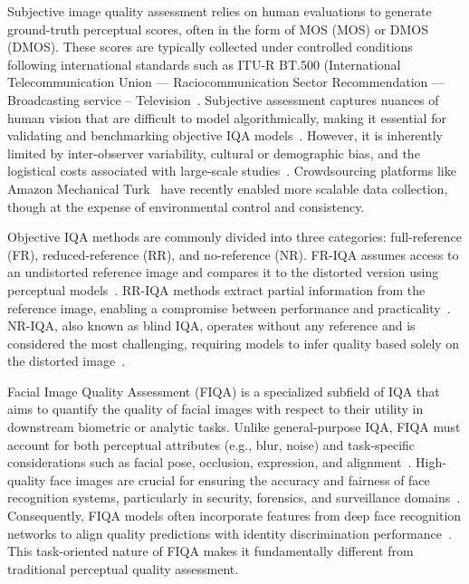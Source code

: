 Subjective image quality assessment relies on human evaluations to generate ground-truth perceptual scores, often in the form of \acl{MOS} (\acs{MOS}) or \acl{DMOS} (\acs{DMOS}). These scores are typically collected under controlled conditions following international standards such as ITU-R BT.500 (International Telecommunication Union --- Raciocommunication Sector Recommendation --- Broadcasting service -- Television~\cite{itu_bt500_2023}. Subjective assessment captures nuances of human vision that are difficult to model algorithmically, making it essential for validating and benchmarking objective IQA models~\cite{ponomarenko_tid2013, zaric_comparison_objective_subjective}. However, it is inherently limited by inter-observer variability, cultural or demographic bias, and the logistical costs associated with large-scale studies~\cite{ghadiyaram_crowdsourced_study_2016}. Crowdsourcing platforms like Amazon Mechanical Turk~\cite{amazon_mturk} have recently enabled more scalable data collection, though at the expense of environmental control and consistency.

Objective IQA methods are commonly divided into three categories: full-reference (FR), reduced-reference (RR), and no-reference (NR). FR-IQA assumes access to an undistorted reference image and compares it to the distorted version using perceptual models~\cite{wang_ssim_2004, sheikh_ifc_2005, zhang_fsim_2011}. RR-IQA methods extract partial information from the reference image, enabling a compromise between performance and practicality~\cite{wang_wavelet_statistics_2005, li_divisive_normalization_2009}. NR-IQA, also known as blind IQA, operates without any reference and is considered the most challenging, requiring models to infer quality based solely on the distorted image~\cite{mittal_brisque_2012, bosse_deep_nriqa_2018}.

Facial Image Quality Assessment (FIQA) is a specialized subfield of IQA that aims to quantify the quality of facial images with respect to their utility in downstream biometric or analytic tasks. Unlike general-purpose IQA, FIQA must account for both perceptual attributes (e.g., blur, noise) and task-specific considerations such as facial pose, occlusion, expression, and alignment~\cite{hernandez_fiqanet_2020, boutros_iqface_2021, li_biofacenet_2021}. High-quality face images are crucial for ensuring the accuracy and fairness of face recognition systems, particularly in security, forensics, and surveillance domains~\cite{xu_secureqnet_2020, luo_deepiq_2018}. Consequently, FIQA models often incorporate features from deep face recognition networks to align quality predictions with identity discrimination performance~\cite{FaceMetric2025}. This task-oriented nature of FIQA makes it fundamentally different from traditional perceptual quality assessment.

